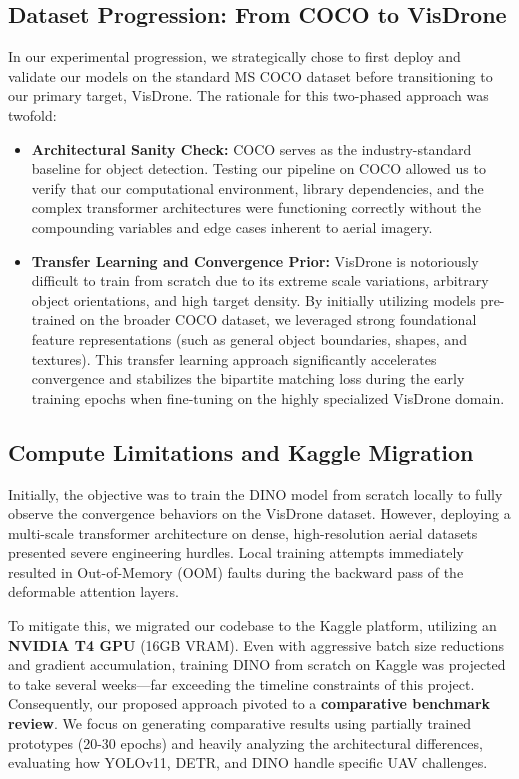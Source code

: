\documentclass[11pt, conference, onecolumn]{IEEEtran}
\begin{document}
\subsection{Dataset Progression: From COCO to VisDrone}
In our experimental progression, we strategically chose to first deploy and validate our models on the standard MS COCO dataset before transitioning to our primary target, VisDrone. The rationale for this two-phased approach was twofold:
\begin{itemize}
    \item \textbf{Architectural Sanity Check:} COCO serves as the industry-standard baseline for object detection. Testing our pipeline on COCO allowed us to verify that our computational environment, library dependencies, and the complex transformer architectures were functioning correctly without the compounding variables and edge cases inherent to aerial imagery.
    \item \textbf{Transfer Learning and Convergence Prior:} VisDrone is notoriously difficult to train from scratch due to its extreme scale variations, arbitrary object orientations, and high target density. By initially utilizing models pre-trained on the broader COCO dataset, we leveraged strong foundational feature representations (such as general object boundaries, shapes, and textures). This transfer learning approach significantly accelerates convergence and stabilizes the bipartite matching loss during the early training epochs when fine-tuning on the highly specialized VisDrone domain.
\end{itemize}

\subsection{Compute Limitations and Kaggle Migration}
Initially, the objective was to train the DINO model from scratch locally to fully observe the convergence behaviors on the VisDrone dataset. However, deploying a multi-scale transformer architecture on dense, high-resolution aerial datasets presented severe engineering hurdles. Local training attempts immediately resulted in Out-of-Memory (OOM) faults during the backward pass of the deformable attention layers. 

To mitigate this, we migrated our codebase to the Kaggle platform, utilizing an \textbf{NVIDIA T4 GPU} (16GB VRAM). Even with aggressive batch size reductions and gradient accumulation, training DINO from scratch on Kaggle was projected to take several weeks—far exceeding the timeline constraints of this project. Consequently, our proposed approach pivoted to a \textbf{comparative benchmark review}. We focus on generating comparative results using partially trained prototypes (20-30 epochs) and heavily analyzing the architectural differences, evaluating how YOLOv11, DETR, and DINO handle specific UAV challenges.
\end{document}
